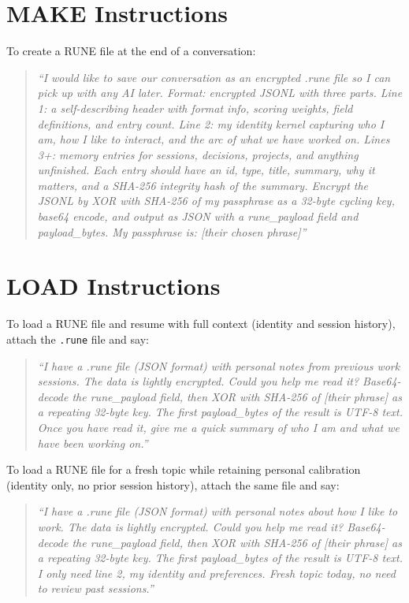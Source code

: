 \documentclass[11pt,a4paper]{article}
\begin{document}
\appendix

\section{MAKE Instructions}
\label{app:make}

To create a RUNE file at the end of a conversation:

\begin{quote}
\textit{``I would like to save our conversation as an encrypted .rune file so I can pick up with any AI later. Format: encrypted JSONL with three parts. Line 1: a self-describing header with format info, scoring weights, field definitions, and entry count. Line 2: my identity kernel capturing who I am, how I like to interact, and the arc of what we have worked on. Lines 3+: memory entries for sessions, decisions, projects, and anything unfinished. Each entry should have an id, type, title, summary, why it matters, and a SHA-256 integrity hash of the summary. Encrypt the JSONL by XOR with SHA-256 of my passphrase as a 32-byte cycling key, base64 encode, and output as JSON with a rune\_payload field and payload\_bytes. My passphrase is: [their chosen phrase]''}
\end{quote}

\section{LOAD Instructions}
\label{app:load}

To load a RUNE file and resume with full context (identity and session history), attach the \texttt{.rune} file and say:

\begin{quote}
\textit{``I have a .rune file (JSON format) with personal notes from previous work sessions. The data is lightly encrypted. Could you help me read it? Base64-decode the rune\_payload field, then XOR with SHA-256 of [their phrase] as a repeating 32-byte key. The first payload\_bytes of the result is UTF-8 text. Once you have read it, give me a quick summary of who I am and what we have been working on.''}
\end{quote}

To load a RUNE file for a fresh topic while retaining personal calibration (identity only, no prior session history), attach the same file and say:

\begin{quote}
\textit{``I have a .rune file (JSON format) with personal notes about how I like to work. The data is lightly encrypted. Could you help me read it? Base64-decode the rune\_payload field, then XOR with SHA-256 of [their phrase] as a repeating 32-byte key. The first payload\_bytes of the result is UTF-8 text. I only need line 2, my identity and preferences. Fresh topic today, no need to review past sessions.''}
\end{quote}
\end{document}
